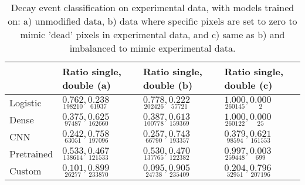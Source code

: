 \begin{table}
\centering
\caption{
Decay event classification on experimental data, with models trained on:
a) unmodified data, b) data where specific pixels are set to zero to mimic
'dead' pixels in experimental data, and c) same as b) and imbalanced to mimic experimental data.
}
\label{tab:classification-experimental-ratios}
\begin{tabular}{llll}
\toprule
{} &                                                                    Ratio single, double (a) &                                                                    Ratio single, double (b) &                                                                   Ratio single, double (c) \\
\midrule
Logistic   &  $\underset{\num{ 198210 }  }{\num{ 0.762 } }, \underset{\num{ 61937 }  }{\num{ 0.238 } }$ &  $\underset{\num{ 202426 }  }{\num{ 0.778 } }, \underset{\num{ 57721 }  }{\num{ 0.222 } }$ &  $\underset{\num{ 260145 }  }{\num{ 1.000 } }, \underset{\num{ 2 }  }{\num{ 0.000 } }$ \\
Dense      &  $\underset{\num{ 97487 }  }{\num{ 0.375 } }, \underset{\num{ 162660 }  }{\num{ 0.625 } }$ &  $\underset{\num{ 100778 }  }{\num{ 0.387 } }, \underset{\num{ 159369 }  }{\num{ 0.613 } }$ &  $\underset{\num{ 260122 }  }{\num{ 1.000 } }, \underset{\num{ 25 }  }{\num{ 0.000 } }$ \\
CNN        &  $\underset{\num{ 63051 }  }{\num{ 0.242 } }, \underset{\num{ 197096 }  }{\num{ 0.758 } }$ &  $\underset{\num{ 66790 }  }{\num{ 0.257 } }, \underset{\num{ 193357 }  }{\num{ 0.743 } }$ &  $\underset{\num{ 98594 }  }{\num{ 0.379 } }, \underset{\num{ 161553 }  }{\num{ 0.621 } }$ \\
Pretrained &  $\underset{\num{ 138614 }  }{\num{ 0.533 } }, \underset{\num{ 121533 }  }{\num{ 0.467 } }$ &  $\underset{\num{ 137765 }  }{\num{ 0.530 } }, \underset{\num{ 122382 }  }{\num{ 0.470 } }$ &  $\underset{\num{ 259448 }  }{\num{ 0.997 } }, \underset{\num{ 699 }  }{\num{ 0.003 } }$ \\
Custom     &  $\underset{\num{ 26277 }  }{\num{ 0.101 } }, \underset{\num{ 233870 }  }{\num{ 0.899 } }$ &  $\underset{\num{ 24738 }  }{\num{ 0.095 } }, \underset{\num{ 235409 }  }{\num{ 0.905 } }$ &  $\underset{\num{ 52951 }  }{\num{ 0.204 } }, \underset{\num{ 207196 }  }{\num{ 0.796 } }$ \\
\bottomrule
\end{tabular}
\end{table}
